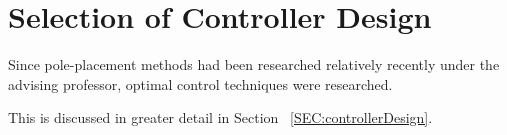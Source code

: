 \documentclass[crop=false,float=true,class=scrreprt]{standalone}
\begin{document}
\section{Selection of Controller Design}
\label{SEC:preliminaryDecisions:selectionControllerDesign}


Since pole-placement methods had been researched relatively recently 
under the advising professor,
optimal control techniques were researched.

This is discussed in greater detail in Section~%
\ref{SEC:controllerDesign}.




\clearpage
\end{document}
